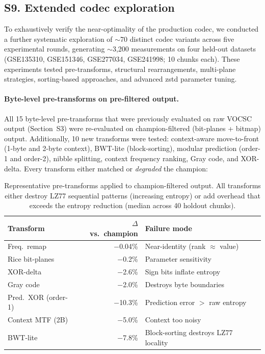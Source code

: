 \documentclass[10pt,twocolumn,letterpaper]{article}
\begin{document}
\subsection*{S9. Extended codec exploration}
\label{sec:extended_codec}

To exhaustively verify the near-optimality of the production codec, we conducted a further systematic exploration of $\sim$70 distinct codec variants across five experimental rounds, generating $\sim$3{,}200 measurements on four held-out datasets (GSE135310, GSE151346, GSE277034, GSE241998; 10 chunks each).
These experiments tested pre-transforms, structural rearrangements, multi-plane strategies, sorting-based approaches, and advanced zstd parameter tuning.

\paragraph{Byte-level pre-transforms on pre-filtered output.}
All 15 byte-level pre-transforms that were previously evaluated on raw VOCSC output (Section~S3) were re-evaluated on champion-filtered (bit-planes + bitmap) output.
Additionally, 10 new transforms were tested: context-aware move-to-front (1-byte and 2-byte context), BWT-lite (block-sorting), modular prediction (order-1 and order-2), nibble splitting, context frequency ranking, Gray code, and XOR-delta.
Every transform either matched or \emph{degraded} the champion:

\begin{table}[h]
\centering
\caption{Representative pre-transforms applied to champion-filtered output. All transforms either destroy LZ77 sequential patterns (increasing entropy) or add overhead that exceeds the entropy reduction (median across 40 holdout chunks).}
\label{tab:extended_transforms}
\footnotesize
\begin{tabular}{lrl}
\toprule
Transform & $\Delta$ vs.\ champion & Failure mode \\
\midrule
Freq.\ remap & $-$0.04\% & Near-identity (rank $\approx$ value) \\
Rice bit-planes & $-$0.2\% & Parameter sensitivity \\
XOR-delta & $-$2.6\% & Sign bits inflate entropy \\
Gray code & $-$2.0\% & Destroys byte boundaries \\
Pred.\ XOR (order-1) & $-$10.3\% & Prediction error $>$ raw entropy \\
Context MTF (2B) & $-$5.0\% & Context too noisy \\
BWT-lite & $-$7.8\% & Block-sorting destroys LZ77 locality \\
\bottomrule
\end{tabular}
\end{table}
\end{document}
